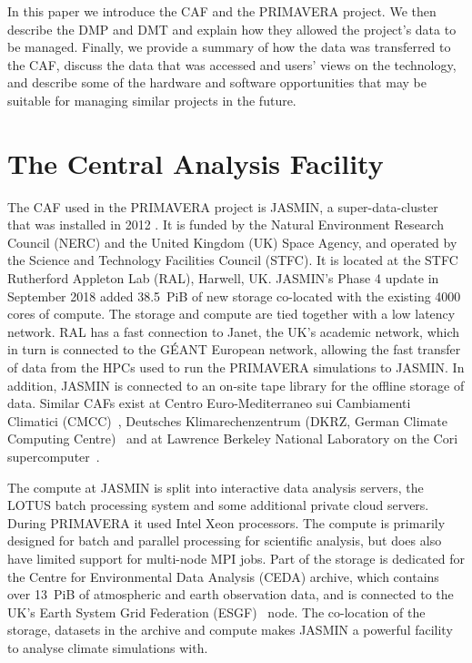 \documentclass[gmd, manuscript]{copernicus}
\begin{document}
In this paper we introduce the CAF and the PRIMAVERA project. We then describe the DMP and DMT and explain how they allowed the project's data to be managed. Finally, we provide a summary of how the data was transferred to the CAF, discuss the data that was accessed and users' views on the technology, and describe some of the hardware and software opportunities that may be suitable for managing similar projects in the future.

\section{The Central Analysis Facility}

The CAF used in the PRIMAVERA project is JASMIN, a super-data-cluster that was installed in 2012 \citep{lawrence2013storing}. It is funded by the Natural Environment Research Council (NERC) and the United Kingdom (UK) Space Agency, and operated by the Science and Technology Facilities Council (STFC). It is located at the STFC Rutherford Appleton Lab (RAL), Harwell, UK. JASMIN's Phase 4 update in September 2018 added 38.5~PiB of new storage co-located with the existing 4000 cores of compute. The storage and compute are tied together with a low latency network. RAL has a fast connection to Janet, the UK's academic network, which in turn is connected to the G\'{E}ANT European network, allowing the fast transfer of data from the HPCs used to run the PRIMAVERA simulations to JASMIN. In addition, JASMIN is connected to an on-site tape library for the offline storage of data. Similar CAFs exist at Centro Euro-Mediterraneo sui Cambiamenti Climatici (CMCC)~\citep{CMCC}, Deutsches Klimarechenzentrum (DKRZ, German Climate Computing Centre)~\citep{dkrz} and at Lawrence Berkeley National Laboratory on the Cori supercomputer~\citep{cori}.

The compute at JASMIN is split into interactive data analysis servers, the LOTUS batch processing system and some additional private cloud servers. During PRIMAVERA it used Intel Xeon processors. The compute is primarily designed for batch and parallel processing for scientific analysis, but does also have limited support for multi-node MPI jobs. Part of the storage is dedicated for the Centre for Environmental Data Analysis (CEDA) archive, which contains over 13~PiB of atmospheric and earth observation data, and is connected to the UK's Earth System Grid Federation (ESGF)~\citep{ESGFCinquini}\citep{gmd-14-629-2021} node. The co-location of the storage, datasets in the archive and compute makes JASMIN a powerful facility to analyse climate simulations with.
\end{document}
